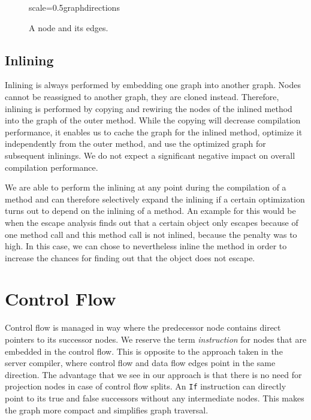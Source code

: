 \documentclass[twocolumn]{svjour3}
\begin{document}
\begin{figure}[ht]
  \centering
\begin{digraphenv}{scale=0.5}{graphdirections}
\end{digraphenv}
  \caption{A node and its edges.}
  \label{fig:directions}
\end{figure}

\subsection{Inlining}
Inlining is always performed by embedding one graph into another graph.
Nodes cannot be reassigned to another graph, they are cloned instead.
Therefore, inlining is performed by copying and rewiring the nodes of the inlined method into the graph of the outer method.
While the copying will decrease compilation performance, it enables us to cache the graph for the inlined method, optimize it independently from the outer method, and use the optimized graph for subsequent inlinings.
We do not expect a significant negative impact on overall compilation performance.

We are able to perform the inlining at any point during the compilation of a method and can therefore selectively expand the inlining if a certain optimization turns out to depend on the inlining of a method.
An example for this would be when the escape analysis finds out that a certain object only escapes because of one method call and this method call is not inlined, because the penalty was to high.
In this case, we can chose to nevertheless inline the method in order to increase the chances for finding out that the object does not escape.

\section{Control Flow}

Control flow is managed in way where the predecessor node contains direct pointers to its successor nodes.
We reserve the term \textit{instruction} for nodes that are embedded in the control flow.
This is opposite to the approach taken in the server compiler, where control flow and data flow edges point in the same direction.
The advantage that we see in our approach is that there is no need for projection nodes in case of control flow splits.
An \texttt{If} instruction can directly point to its true and false successors without any intermediate nodes.
This makes the graph more compact and simplifies graph traversal.
\end{document}
